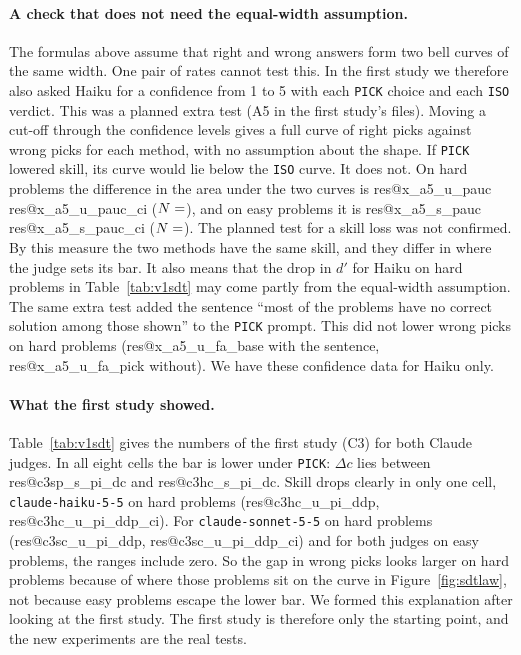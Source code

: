 \documentclass[10pt,twocolumn]{article}
\makeatletter
\newcommand{\res}[1]{\csname res@#1\endcsname}
\makeatother
\begin{document}
\paragraph{A check that does not need the equal-width assumption.}
The formulas above assume that right and wrong answers form two bell curves of the same width. One pair of rates cannot test this. In the first study we therefore also asked Haiku for a confidence from 1 to 5 with each \texttt{PICK} choice and each \texttt{ISO} verdict. This was a planned extra test (A5 in the first study's files). Moving a cut-off through the confidence levels gives a full curve of right picks against wrong picks for each method, with no assumption about the shape. If \texttt{PICK} lowered skill, its curve would lie below the \texttt{ISO} curve. It does not. On hard problems the difference in the area under the two curves is \res{x_a5_u_pauc} \res{x_a5_u_pauc_ci} ($N=\res{x_a5_u_n}$), and on easy problems it is \res{x_a5_s_pauc} \res{x_a5_s_pauc_ci} ($N=\res{x_a5_s_n}$). The planned test for a skill loss was not confirmed. By this measure the two methods have the same skill, and they differ in where the judge sets its bar. It also means that the drop in $d'$ for Haiku on hard problems in Table~\ref{tab:v1sdt} may come partly from the equal-width assumption. The same extra test added the sentence ``most of the problems have no correct solution among those shown'' to the \texttt{PICK} prompt. This did not lower wrong picks on hard problems (\res{x_a5_u_fa_base} with the sentence, \res{x_a5_u_fa_pick} without). We have these confidence data for Haiku only.

\paragraph{What the first study showed.}
Table~\ref{tab:v1sdt} gives the numbers of the first study (C3) for both Claude judges. In all eight cells the bar is lower under \texttt{PICK}: $\Delta c$ lies between \res{c3sp_s_pi_dc} and \res{c3hc_s_pi_dc}. Skill drops clearly in only one cell, \texttt{claude-haiku-5-5} on hard problems (\res{c3hc_u_pi_ddp}, \res{c3hc_u_pi_ddp_ci}). For \texttt{claude-sonnet-5-5} on hard problems (\res{c3sc_u_pi_ddp}, \res{c3sc_u_pi_ddp_ci}) and for both judges on easy problems, the ranges include zero. So the gap in wrong picks looks larger on hard problems because of where those problems sit on the curve in Figure~\ref{fig:sdtlaw}, not because easy problems escape the lower bar. We formed this explanation after looking at the first study. The first study is therefore only the starting point, and the new experiments are the real tests.
\end{document}
